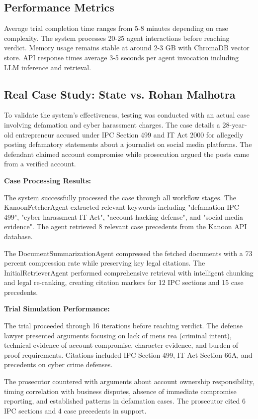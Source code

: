 \documentclass[12pt,singleside,a4paper]{article}
\begin{document}
\subsection{Performance Metrics}
Average trial completion time ranges from 5-8 minutes depending on case complexity. The system processes 20-25 agent interactions before reaching verdict. Memory usage remains stable at around 2-3 GB with ChromaDB vector store. API response times average 3-5 seconds per agent invocation including LLM inference and retrieval.

\subsection{Real Case Study: State vs. Rohan Malhotra}
To validate the system's effectiveness, testing was conducted with an actual case involving defamation and cyber harassment charges. The case details a 28-year-old entrepreneur accused under IPC Section 499 and IT Act 2000 for allegedly posting defamatory statements about a journalist on social media platforms. The defendant claimed account compromise while prosecution argued the posts came from a verified account.

\textbf{Case Processing Results:}

The system successfully processed the case through all workflow stages. The KanoonFetcherAgent extracted relevant keywords including "defamation IPC 499", "cyber harassment IT Act", "account hacking defense", and "social media evidence". The agent retrieved 8 relevant case precedents from the Kanoon API database.

The DocumentSummarizationAgent compressed the fetched documents with a 73 percent compression rate while preserving key legal citations. The InitialRetrieverAgent performed comprehensive retrieval with intelligent chunking and legal re-ranking, creating citation markers for 12 IPC sections and 15 case precedents.

\textbf{Trial Simulation Performance:}

The trial proceeded through 16 iterations before reaching verdict. The defense lawyer presented arguments focusing on lack of mens rea (criminal intent), technical evidence of account compromise, character evidence, and burden of proof requirements. Citations included IPC Section 499, IT Act Section 66A, and precedents on cyber crime defenses.

The prosecutor countered with arguments about account ownership responsibility, timing correlation with business disputes, absence of immediate compromise reporting, and established patterns in defamation cases. The prosecutor cited 6 IPC sections and 4 case precedents in support.
\end{document}
